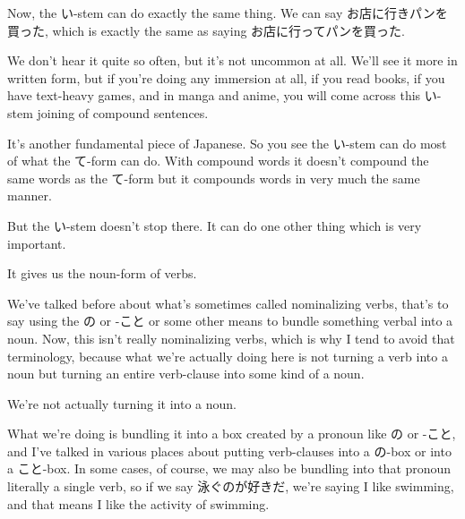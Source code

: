Now, the い-stem can do exactly the same thing. We can say お店に行きパンを買った, which is exactly the same as saying\crlf
お店に行ってパンを買った.

{}

We don't hear it quite so often, but it's not uncommon at all. We'll see it more in written form, but if you're doing any immersion at all, if you read books, if you have text-heavy games, and in manga and anime, you will come across this い-stem joining of compound sentences.

It's another fundamental piece of Japanese. So you see the い-stem can do most of what the て-form can do. With compound words it doesn't compound the same words as the て-form but it compounds words in very much the same manner.

{}

\stopsectionlevel

\stopsectionlevel

\startsectionlevel[title={連用形 giving noun-form of verbs (verb clauses)},reference={連用形-giving-noun-form-of-verbs-verb-clauses}]

But the い-stem doesn't stop there. It can do one other thing which is very important.

It gives us the noun-form of verbs.

{}

We've talked before about what's sometimes called nominalizing verbs, that's to say using the の or -こと or some other means to bundle something verbal into a noun. Now, this isn't really nominalizing verbs, which is why I tend to avoid that terminology, because what we're actually doing here is not turning a verb into a noun but turning an entire verb-clause into some kind of a noun.

We're not actually turning it into a noun.

{}

What we're doing is bundling it into a box created by a pronoun like の or -こと, and I've talked in various places about putting verb-clauses into a の-box or into a こと-box. In some cases, of course, we may also be bundling into that pronoun literally a single verb, so if we say 泳ぐのが好きだ, we're saying I like swimming, and that means I like the activity of swimming.

{}

